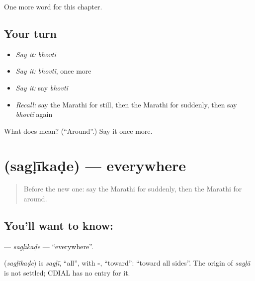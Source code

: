 \begin{grammarlens}[title={What you've built}]
One more word for this chapter.
\end{grammarlens}

\subsection*{Your turn}
\begin{itemize}
\raggedright
  \item \emph{Say it:} \emph{bhovtī}
  \item \emph{Say it:} \emph{bhovtī}, once more
  \item \emph{Say it:} say \emph{bhovtī}
  \item \emph{Recall:} say the Marathi for still, then the Marathi for suddenly, then say \emph{bhovtī} again
\end{itemize}

\begin{tcolorbox}[breakable,colback=teal!4,colframe=teal!35!black,title={Before you move on}]
What does  mean? (\textquotedblleft{}Around\textquotedblright{}.) Say it once more.
\end{tcolorbox}
\section[\texorpdfstring{\mr{सगळीकडे} (sagḷīkaḍe)}{सगळीकडे (sagḷīkaḍe)}]{ (sagḷīkaḍe) — everywhere}

\label{lesson:MR-C172-saglikade}



\begin{quote}
Before the new one: say the Marathi for suddenly, then the Marathi for around.
\end{quote}

\subsection*{You'll want to know: }
\textbf{} — \emph{sagḷīkaḍe} — \textquotedblleft{}everywhere\textquotedblright{}.

\begin{cousinweb}
\textbf{} (\emph{sagḷīkaḍe}) is \emph{sagḷī}, \textquotedblleft{}all\textquotedblright{}, with \textbf{-}, \textquotedblleft{}toward\textquotedblright{}: \textquotedblleft{}toward all sides\textquotedblright{}. The origin of \emph{sagḷā} is not settled; CDIAL has no entry for it.
\end{cousinweb}

